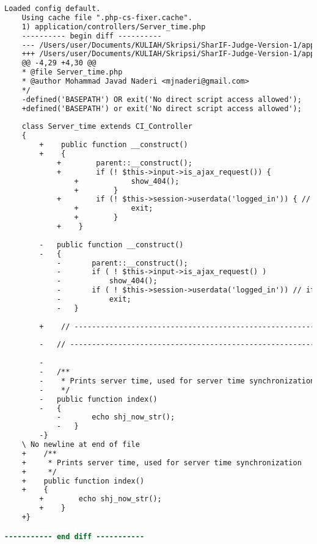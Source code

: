 \begin{lstlisting}[language=diff, caption=Perubahan pada kode Server\_time.php]
	Loaded config default.
	Using cache file ".php-cs-fixer.cache".
	1) application/controllers/Server_time.php
	---------- begin diff ----------
	--- /Users/user/Documents/KULIAH/Skripsi/SharIF-Judge-Version-1/application/controllers/Server_time.php
	+++ /Users/user/Documents/KULIAH/Skripsi/SharIF-Judge-Version-1/application/controllers/Server_time.php
	@@ -4,29 +4,30 @@
	* @file Server_time.php
	* @author Mohammad Javad Naderi <mjnaderi@gmail.com>
	*/
	-defined('BASEPATH') OR exit('No direct script access allowed');
	+defined('BASEPATH') or exit('No direct script access allowed');
	
	class Server_time extends CI_Controller
	{
		+    public function __construct()
		+    {
			+        parent::__construct();
			+        if (! $this->input->is_ajax_request()) {
				+            show_404();
				+        }
			+        if (! $this->session->userdata('logged_in')) { // if not logged in
				+            exit;
				+        }
			+    }
		
		-	public function __construct()
		-	{
			-		parent::__construct();
			-		if ( ! $this->input->is_ajax_request() )
			-			show_404();
			-		if ( ! $this->session->userdata('logged_in')) // if not logged in
			-			exit;
			-	}
		
		+    // ------------------------------------------------------------------------
		
		-	// ------------------------------------------------------------------------
		
		-
		-	/**
		-	 * Prints server time, used for server time synchronization
		-	 */
		-	public function index()
		-	{
			-		echo shj_now_str();
			-	}
		-}
	\ No newline at end of file
	+    /**
	+     * Prints server time, used for server time synchronization
	+     */
	+    public function index()
	+    {
		+        echo shj_now_str();
		+    }
	+}

----------- end diff -----------
\end{lstlisting}

